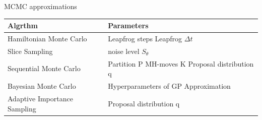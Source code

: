 \documentclass{beamer}
\begin{document}
\begin{frame}{MCMC approximations}
\begin{center}
	\begin{tabu} to 1.0 \textwidth{||X[l] X[c]||} 
		\hline
		Algrthm & Parameters\\ [0.5ex] 
		\hline\hline
		Hamiltonian Monte Carlo  & Leapfrog steps \newline Leapfrog $\Delta t$  \\ 
		\hline
		Slice Sampling & noise level $S_{\theta}$  \\
		\hline
		Sequential Monte Carlo  & Partition P \newline MH-moves K \newline Proposal distribution q  \\
		\hline
		 Bayesian
		Monte Carlo   & Hyperparameters of GP Approximation \\
		\hline
		 Adaptive Importance Sampling  & Proposal distribution  q\\ [1ex] 
		\hline
	\end{tabu}
\end{center}
\end{frame}
\end{document}
